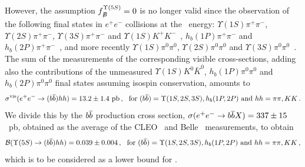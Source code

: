 However, the assumption $f^{\Upsilon(5S)}_{B\!\!\!\!/}=0$ is no longer valid since the observation of
the following final states in $e^+e^-$ collisions at the \Upsfive\ energy:
$\Upsilon(1S)\pi^+\pi^-$,
$\Upsilon(2S)\pi^+\pi^-$,
$\Upsilon(3S)\pi^+\pi^-$
and
$\Upsilon(1S)K^+K^-$~\cite{Abe:2007tk,Garmash:2014dhx_mod},
$h_b(1P)\pi^+\pi^-$ and 
$h_b(2P)\pi^+\pi^-$~\cite{Adachi:2011ji},
and more recently 
$\Upsilon(1S)\pi^0\pi^0$,
$\Upsilon(2S)\pi^0\pi^0$ 
and
$\Upsilon(3S)\pi^0\pi^0$~\cite{Krokovny:2013mgx}.
The sum of the measurements of the corresponding visible cross-sections,
adding also the contributions of the unmeasured
$\Upsilon(1S)K^0\bar{K}^0$, $h_b(1P)\pi^0\pi^0$ and $h_b(2P)\pi^0\pi^0$ final states
assuming isospin conservation, amounts to
$$
\sigma^{\rm vis}(e^+e^-\to (\b\bar{\b})hh) = 13.2\pm1.4~{\rm pb} \,,
~~\mbox{for $(\b\bar{\b})=\Upsilon(1S,2S,3S),h_b(1P,2P)$ and $hh=\pi\pi,KK$}\,.
$$
We divide this by the $\b\bar{\b}$ production cross section, 
$\sigma(e^+e^- \to \b\bar{\b} X) = 337 \pm 15$~pb, obtained as the average of the 
CLEO~\cite{Artuso:2005xw} and Belle~\cite{Esen:2012yz_mod} measurements, to obtain
$$
{\cal B}(\Upsfive\to (\b\bar{\b})hh) = 0.039\pm0.004 \,,
~~\mbox{for $(\b\bar{\b})=\Upsilon(1S,2S,3S),h_b(1P,2P)$ and $hh=\pi\pi,KK$}\,,
$$
which is to be considered as a lower bound for \fnBfive. 


